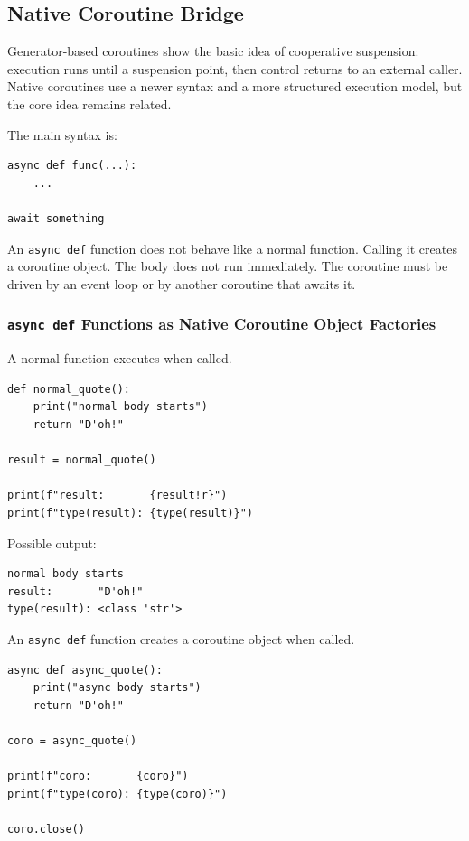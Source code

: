 \subsection{Native Coroutine Bridge}

Generator-based coroutines show the basic idea of cooperative suspension: execution runs until a suspension point, then control returns to an external caller. Native coroutines use a newer syntax and a more structured execution model, but the core idea remains related.

The main syntax is:

\begin{verbatim}
async def func(...):
    ...

await something
\end{verbatim}

An \texttt{async def} function does not behave like a normal function. Calling it creates a coroutine object. The body does not run immediately. The coroutine must be driven by an event loop or by another coroutine that awaits it.

\subsubsection{\texttt{async def} Functions as Native Coroutine Object Factories}

A normal function executes when called.

\begin{verbatim}
def normal_quote():
    print("normal body starts")
    return "D'oh!"

result = normal_quote()

print(f"result:       {result!r}")
print(f"type(result): {type(result)}")
\end{verbatim}

Possible output:

\begin{verbatim}
normal body starts
result:       "D'oh!"
type(result): <class 'str'>
\end{verbatim}

An \texttt{async def} function creates a coroutine object when called.

\begin{verbatim}
async def async_quote():
    print("async body starts")
    return "D'oh!"

coro = async_quote()

print(f"coro:       {coro}")
print(f"type(coro): {type(coro)}")

coro.close()
\end{verbatim}

